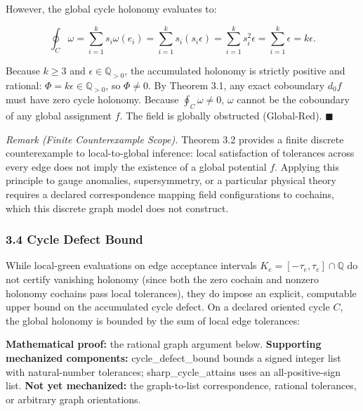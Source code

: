 \documentclass[
  10pt,
]{article}
\begin{document}
However, the global cycle holonomy evaluates to:

\hypertarget{math-E0117-0145}{}{\[\oint_C \omega = \sum_{i=1}^k s_i \omega(e_i) = \sum_{i=1}^k s_i (s_i \epsilon) = \sum_{i=1}^k s_i^2 \epsilon = \sum_{i=1}^k \epsilon = k \epsilon.\]}

Because \hypertarget{math-E0094-0146}{}{\(k \ge 3\)} and \hypertarget{math-E0118-0147}{}{\(\epsilon \in \mathbb{Q}_{> 0}\)}, the accumulated holonomy is strictly positive and rational: \hypertarget{math-E0119-0148}{}{\(\Phi = k\epsilon \in \mathbb{Q}_{> 0}\)}, so \hypertarget{math-E0120-0149}{}{\(\Phi \ne 0\)}. By Theorem 3.1, any exact coboundary \hypertarget{math-E0086-0150}{}{\(d_0 f\)} must have zero cycle holonomy. Because \hypertarget{math-E0121-0151}{}{\(\oint_C \omega \ne 0\)}, \hypertarget{math-E0099-0152}{}{\(\omega\)} cannot be the coboundary of any global assignment \hypertarget{math-E0122-0153}{}{\(f\)}. The field is globally obstructed (Global-Red). \hypertarget{math-E0035-0154}{}{\(\blacksquare\)}

\emph{Remark (Finite Counterexample Scope).} Theorem 3.2 provides a finite discrete counterexample to local-to-global inference: local satisfaction of tolerances across every edge does not imply the existence of a global potential \hypertarget{math-E0122-0155}{}{\(f\)}. Applying this principle to gauge anomalies, supersymmetry, or a particular physical theory requires a declared correspondence mapping field configurations to cochains, which this discrete graph model does not construct.

\subsubsection{3.4 Cycle Defect Bound}\label{cycle-defect-bound}

While local-green evaluations on edge acceptance intervals \hypertarget{math-E0077-0156}{}{\(K_e = [-\tau_e, \tau_e] \cap \mathbb{Q}\)} do not certify vanishing holonomy (since both the zero cochain and nonzero holonomy cochains pass local tolerances), they do impose an explicit, computable upper bound on the accumulated cycle defect. On a declared oriented cycle \hypertarget{math-E0097-0157}{}{\(C\)}, the global holonomy is bounded by the sum of local edge tolerances:

\textbf{Mathematical proof:} the rational graph argument below. \textbf{Supporting mechanized components:} cycle\_defect\_bound bounds a signed integer list with natural-number tolerances; sharp\_cycle\_attains uses an all-positive-sign list. \textbf{Not yet mechanized:} the graph-to-list correspondence, rational tolerances, or arbitrary graph orientations.
\end{document}
